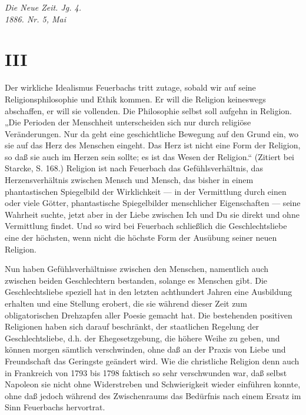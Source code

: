 \quebra

\begin{flushright}
\emph{Die Neue Zeit. Jg. 4.}\\
\emph{1886. Nr. 5, Mai}
\end{flushright}

\vspace{2cm}

\section{III}


\noindent{}Der wirkliche Idealismus Feuerbachs tritt zutage, sobald wir auf
seine Religionsphilosophie und Ethik kommen. Er will die Religion
keineswegs abschaffen, er will sie vollenden. Die Philosophie selbst
soll aufgehn in Religion. „Die Perioden der Menschheit unterscheiden
sich nur durch religiöse Veränderungen. Nur da geht eine geschichtliche
Bewegung auf den Grund ein, wo sie auf das Herz des Menschen eingeht.
Das Herz ist nicht eine Form der Religion, so daß sie auch im Herzen
sein sollte; es ist das Wesen der Religion.`` (Zitiert bei Starcke, S.
168.) Religion ist nach Feuerbach das Gefühlsverhältnis, das
Herzensverhältnis zwischen Mensch und Mensch, das bisher in einem
phantastischen Spiegelbild der Wirklichkeit --- in der Vermittlung durch
einen oder viele Götter, phantastische Spiegelbilder menschlicher
Eigenschaften --- seine Wahrheit suchte, jetzt aber in der Liebe zwischen
Ich und Du sie direkt und ohne Vermittlung findet. Und so wird bei
Feuerbach schließlich die Geschlechtsliebe eine der höchsten, wenn nicht
die höchste Form der Ausübung seiner neuen Religion.

Nun haben Gefühlsverhältnisse zwischen den Menschen, namentlich
auch zwischen beiden Geschlechtern bestanden, solange es Menschen gibt.
Die Geschlechtsliebe speziell hat in den letzten achthundert Jahren eine
Ausbildung erhalten und eine Stellung erobert, die sie während dieser
Zeit zum obligatorischen Drehzapfen aller Poesie gemacht hat. Die
bestehenden positiven Religionen haben sich darauf beschränkt, der
staatlichen Regelung der Geschlechtsliebe, d.h. der Ehegesetzgebung, die
höhere Weihe zu geben, und können morgen sämtlich verschwinden, ohne daß
an der Praxis von Liebe und Freundschaft das Geringste geändert wird.
Wie die christliche Religion denn auch in Frankreich von 1793 bis 1798
faktisch so sehr verschwunden war, daß selbst Napoleon sie nicht ohne
Widerstreben und Schwierigkeit wieder einführen konnte, ohne daß jedoch
während des Zwischenraums das Bedürfnis nach einem Ersatz im Sinn
Feuerbachs hervortrat.

